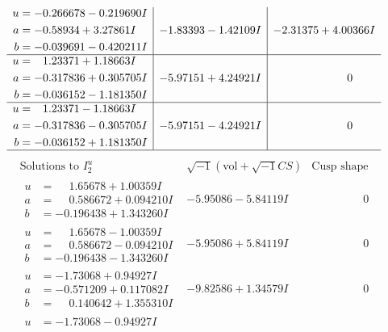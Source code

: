 \documentclass[1p]{elsarticle_modified}
\theoremstyle{definition}
\newcommand{\I}{\sqrt{-1}}
\begin{document}
$$\begin{array}{c|c|c}
\begin{aligned}
u &= -0.266678 - 0.219690 I \\
a &= -0.58934 + 3.27861 I \\
b &= -0.039691 - 0.420211 I\end{aligned}
 & -1.83393 - 1.42109 I & -2.31375 + 4.00366 I \\ \hline\begin{aligned}
u &= \phantom{-}1.23371 + 1.18663 I \\
a &= -0.317836 + 0.305705 I \\
b &= -0.036152 - 1.181350 I\end{aligned}
 & -5.97151 + 4.24921 I & \phantom{-0.000000 } 0 \\ \hline\begin{aligned}
u &= \phantom{-}1.23371 - 1.18663 I \\
a &= -0.317836 - 0.305705 I \\
b &= -0.036152 + 1.181350 I\end{aligned}
 & -5.97151 - 4.24921 I & \phantom{-0.000000 } 0\\
 \hline 
 \end{array}$$\newpage$$\begin{array}{c|c|c}  
\text{Solutions to }I^u_{2}& \I (\text{vol} + \sqrt{-1}CS) & \text{Cusp shape}\\
 \hline 
\begin{aligned}
u &= \phantom{-}1.65678 + 1.00359 I \\
a &= \phantom{-}0.586672 + 0.094210 I \\
b &= -0.196438 + 1.343260 I\end{aligned}
 & -5.95086 - 5.84119 I & \phantom{-0.000000 } 0 \\ \hline\begin{aligned}
u &= \phantom{-}1.65678 - 1.00359 I \\
a &= \phantom{-}0.586672 - 0.094210 I \\
b &= -0.196438 - 1.343260 I\end{aligned}
 & -5.95086 + 5.84119 I & \phantom{-0.000000 } 0 \\ \hline\begin{aligned}
u &= -1.73068 + 0.94927 I \\
a &= -0.571209 + 0.117082 I \\
b &= \phantom{-}0.140642 + 1.355310 I\end{aligned}
 & -9.82586 + 1.34579 I & \phantom{-0.000000 } 0 \\ \hline\begin{aligned}
u &= -1.73068 - 0.94927 I \\

\end{aligned}
\end{array}$$
\end{document}
